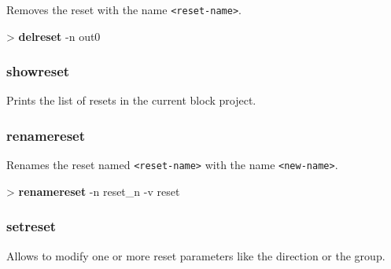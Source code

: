 \documentclass[10pt,a4paper]{article}
\begin{document}
Removes the reset with the name \texttt{<reset-name>}.\\


\begin{sampletitle}
> \textbf{\tool{} delreset} -n out0
\end{sampletitle}


\subsubsection{showreset}
\label{subsec:showreset}

Prints the list of resets in the current block project.

\subsubsection{renamereset}
\label{subsec:renamereset}

Renames the reset named \texttt{<reset-name>} with the name \texttt{<new-name>}.\\


\begin{sampletitle}
> \textbf{\tool{} renamereset} -n reset\_n -v reset
\end{sampletitle}


\subsubsection{setreset}
\label{subsec:setreset}

Allows to modify one or more reset parameters like the direction or the group.\\
\end{document}
